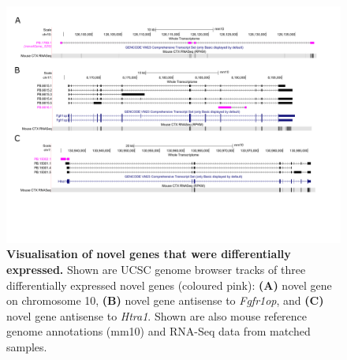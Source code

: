 \begin{landscape}
	\begin{figure}[!htp]
		\centering
		\includegraphics[page=1,trim={0 3.5cm 0 1cm}, scale = 0.80]{Figures/TracksFigures_Diff.pdf}
		\captionsetup{width=1.4\textwidth}
		\caption[Visualisation of differentially expressed novel genes]%
		{\textbf{Visualisation of novel genes that were differentially expressed.} Shown are UCSC genome browser tracks of three differentially expressed novel genes (coloured pink): \textbf{(A)} novel gene on chromosome 10, \textbf{(B)} novel gene antisense to \textit{Fgfr1op}, and \textbf{(C)} novel gene antisense to \textit{Htra1}. Shown are also mouse reference genome annotations (mm10) and RNA-Seq data from matched samples.}   
		\label{fig:whole_novelgene_difftracks}
	\end{figure}
\end{landscape}

